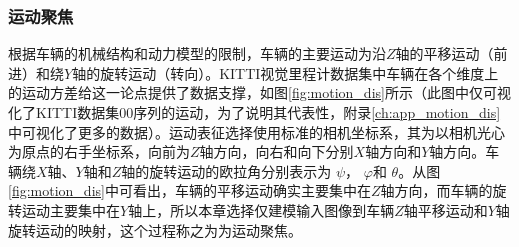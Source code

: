 \subsubsection{运动聚焦}
根据车辆的机械结构和动力模型的限制，车辆的主要运动为沿$Z$轴的平移运动（前进）和绕$Y$轴的旋转运动（转向）。KITTI视觉里程计数据集中车辆在各个维度上的运动方差给这一论点提供了数据支撑，如图\ref{fig:motion_dis}所示（此图中仅可视化了KITTI数据集00序列的运动，为了说明其代表性，附录\ref{ch:app_motion_dis}中可视化了更多的数据）。运动表征选择使用标准的相机坐标系，其为以相机光心为原点的右手坐标系，向前为$Z$轴方向，向右和向下分别$X$轴方向和$Y$轴方向。车辆绕$X$轴、$Y$轴和$Z$轴的旋转运动的欧拉角分别表示为 $\psi$， $\varphi$和 $\theta$。从图\ref{fig:motion_dis}中可看出，车辆的平移运动确实主要集中在$Z$轴方向，而车辆的旋转运动主要集中在$Y$轴上，所以本章选择仅建模输入图像到车辆$Z$轴平移运动和$Y$轴旋转运动的映射，这个过程称之为为运动聚焦。
